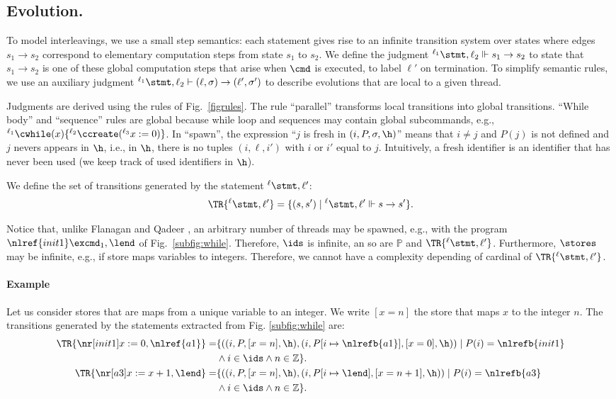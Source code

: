 \documentclass[12pt]{article}
\newcommand{\lab}{  {}^{\ell}}
\newcommand{\li}[1]{ {}^{\ell_{#1}}  }
\begin{document}
\subsection{Evolution.} 
\label{subsection:evol}

To model interleavings, we use a small step semantics: each statement gives rise to an infinite transition system over states where edges \(s_1\rightarrow s_2 \) correspond to elementary computation steps from state \(s_1\) to \(s_2\). We define the judgment \( \li1 \stmt,\ell_2 \Vdash s_1 \rightarrow s_2\) to state that \(s_1\rightarrow s_2 \) is one of these global computation steps that arise when \(\cmd\) is executed, \returning{} to label \(\ell'\) on termination. 
To simplify semantic rules, we use an auxiliary judgment \(\li1 \stmt,\ell_2 \vdash (\ell,\m)\rightarrow(\ell',\m')\) to describe evolutions that are local to a given thread.

Judgments are derived using the rules of Fig.~\ref{figrules}.
 The rule ``parallel'' transforms local transitions into global transitions. ``While body'' and ``sequence'' rules are global because while loop and sequences may contain global subcommands, e.g., \(\li1\cwhile(x)\{\li2\ccreate(\li3x:=0)\}\).
In ``spawn'', the expression ``\(j\) is fresh in \((i,P,\m,\h)\)'' means that \(i\neq j\) and \(P(j)\) is not defined and \(j\) nevers appears in \(\h\), i.e., in \(\h\), there is no tuples \((i,\ell,i')\) with \(i\) or \(i'\) equal to \(j\). Intuitively, a fresh identifier is an identifier that has never been used (we keep track of used identifiers in \(\h\)).



We define the set of transitions generated by the statement \(\lab{}\stmt,\ell'\):
\[\TR{\lab{}\stmt,\ell'}=\{(s,s')\mid\lab \stmt,\ell'\Vdash s\rightarrow s' \}.\]

Notice that, unlike Flanagan and Qadeer \cite{DBLP:conf/spin/FlanaganQ03}, an arbitrary number of threads may be spawned, e.g., with the program \(\nlref{init1}\excmd_1,\lend\) of Fig.~\ref{subfig:while}. Therefore, \(\ids\) is infinite, an so are  \(\mathbb{P}\) and \(\TR{\lab{}\stmt,\ell'}\). Furthermore, \(\stores\) may be  infinite, e.g., if store maps variables to integers.
Therefore, we cannot have a complexity depending of cardinal of \(\TR{\lab{}\stmt,\ell'}\).


\paragraph{Example}
Let us consider stores that are maps from a unique variable to an integer. We write \([x=n]\) the store that maps \(x\) to the integer \(n\). The transitions generated by the statements extracted from Fig. \ref{subfig:while} are:
\begin{align*}
 \TR{\nr[init1] x:=0,\nlref{a1}}=&\{((i,P,[x=n],\h),(i,\fx{P}{i}{\nlrefb{a1}},[x=0],\h))\mid P(i)=\nlrefb{init1}\\& \wedge i\in\ids\wedge n\in\mathbb{Z}\}.\\
 \TR{\nr[a3] x:=x+1,\lend}=&
  \{((i,P,[x=n],\h),(i,\fx{P}{i}{\lend},[x=n+1],\h))\mid P(i)=\nlrefb{a3} \\&\wedge i\in\ids\wedge n\in\mathbb{Z}\}.
\end{align*}
\end{document}
